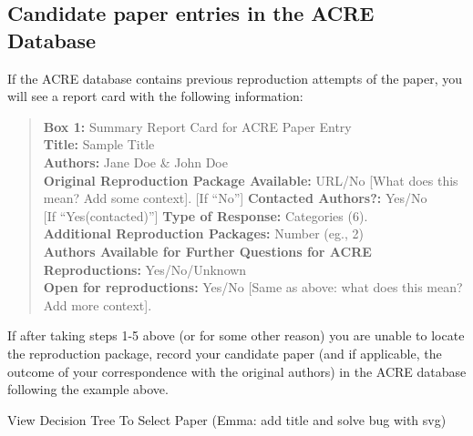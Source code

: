 \documentclass[]{book}
\begin{document}
\hypertarget{candidate-paper-entries-in-the-acre-database}{%
\subsection{Candidate paper entries in the ACRE Database}\label{candidate-paper-entries-in-the-acre-database}}

If the ACRE database contains previous reproduction attempts of the paper, you will see a report card with the following information:

\begin{quote}
\textbf{Box 1:} Summary Report Card for ACRE Paper Entry\\
\textbf{Title:} Sample Title\\
\textbf{Authors:} Jane Doe \& John Doe\\
\textbf{Original Reproduction Package Available:} URL/No {[}What does this mean? Add some context{]}.
{[}If ``No''{]} \textbf{Contacted Authors?:} Yes/No\\
{[}If ``Yes(contacted)''{]} \textbf{Type of Response:} Categories (6).\\
\textbf{Additional Reproduction Packages:} Number (eg., 2)\\
\textbf{Authors Available for Further Questions for ACRE Reproductions:} Yes/No/Unknown\\
\textbf{Open for reproductions:} Yes/No {[}Same as above: what does this mean? Add more context{]}.
\end{quote}

If after taking steps 1-5 above (or for some other reason) you are unable to locate the reproduction package, record your candidate paper (and if applicable, the outcome of your correspondence with the original authors) in the ACRE database following the example above.

View Decision Tree To Select Paper (Emma: add title and solve bug with svg)
\end{document}
